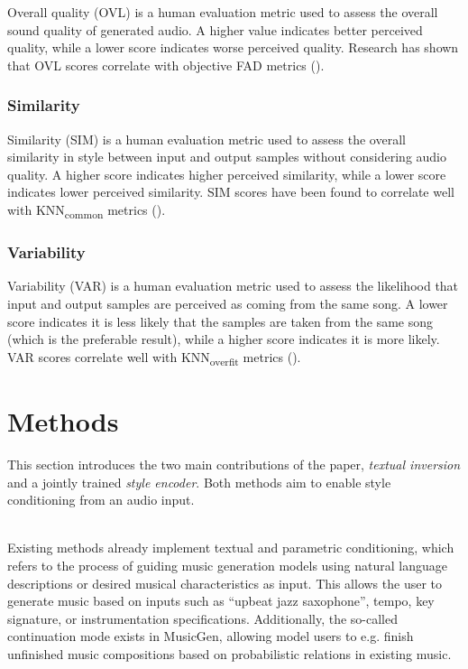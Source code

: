 \documentclass[a4paper,12pt,twoside]{article}
\begin{document}
Overall quality (OVL) is a human evaluation metric used to assess the overall sound quality of generated audio. A higher value indicates better perceived quality, while a lower score indicates worse perceived quality. Research has shown that OVL scores correlate with objective FAD metrics (\cite{rouardAudioConditioningMusic2024}).

\subsubsection*{Similarity}\label{sec:SIM}

Similarity (SIM) is a human evaluation metric used to assess the overall similarity in style between input and output samples without considering audio quality. A higher score indicates higher perceived similarity, while a lower score indicates lower perceived similarity. SIM scores have been found to correlate well with KNN\textsubscript{common} metrics (\cite{rouardAudioConditioningMusic2024}).

\subsubsection*{Variability}\label{sec:VAR}

Variability (VAR) is a human evaluation metric used to assess the likelihood that input and output samples are perceived as coming from the same song. A lower score indicates it is less likely that the samples are taken from the same song (which is the preferable result), while a higher score indicates it is more likely. VAR scores correlate well with KNN\textsubscript{overfit} metrics (\cite{rouardAudioConditioningMusic2024}).

\section{Methods}\label{sec:methods}

This section introduces the two main contributions of the paper, \textit{textual inversion} and a jointly trained \textit{style encoder}. Both methods aim to enable style conditioning from an audio input.\\ \

Existing methods already implement textual and parametric conditioning, which refers to the process of guiding music generation models using natural language descriptions or desired musical characteristics as input. This allows the user to generate music based on inputs such as ``upbeat jazz saxophone'', tempo, key signature, or instrumentation specifications. Additionally, the so-called continuation mode exists in MusicGen, allowing model users to e.g. finish unfinished music compositions based on probabilistic relations in existing music.\\ \
\end{document}

